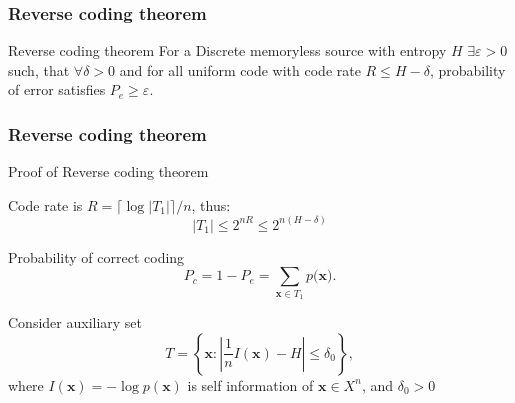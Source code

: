 \documentclass[14pt]{beamer}
\renewcommand{\vec}[1]{\ensuremath{\boldsymbol{#1}}}
\begin{document}

\begin{frame}
\frametitle{Reverse coding theorem}
\begin{itemize}
    \begin{theorem}{Reverse coding theorem} For a Discrete memoryless source with entropy $H$ $\exists \varepsilon > 0$ such, that $\forall \delta > 0$ and for all uniform code with code rate $R \le H - \delta $, probability of error satisfies $P_e \ge \varepsilon $.
    \end{theorem}

\end{itemize}
\end{frame}


\begin{frame}
\frametitle{Reverse coding theorem}
Proof of Reverse coding theorem
\begin{itemize}
\small{ 

    \item Code rate is $R = \lceil \log \vert T_1 \vert \rceil /n$, thus:
    \begin{equation}
    \label{eq29} \vert T_1 \vert \leq  2^{nR} \le 2^{n(H - \delta )}
    \end{equation}

    \item Probability of correct coding
    \begin{equation}
    \label{eq30} P_c = 1 - P_e = \sum\limits_{\vec x \in T_1 } {p(\vec x} ).
    \end{equation}

    \item Consider auxiliary set
    \begin{equation}
    \label{eq31} T = \left\{ {\vec x:\left| {\frac{1}{n}I(\vec x) - H}
    \right| \le \delta _0 } \right\},
    \end{equation}
    where $I(\vec x) = - \log p(\vec x)$ is self information of $\vec x \in X^n$, and $\delta _0 > 0$
}
\end{itemize}
\end{frame}
\end{document}
